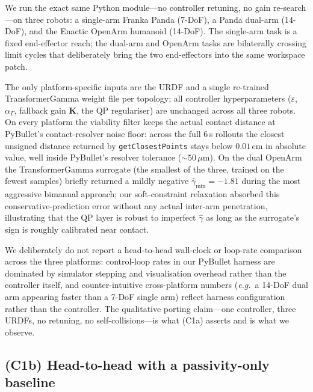\documentclass[10pt,conference]{IEEEtran}
\theoremstyle{remark}
\theoremstyle{plain}
\begin{document}
We run the exact same Python module---no controller retuning, no
gain re-search---on three robots: a single-arm Franka Panda
(7-DoF), a Panda dual-arm (14-DoF), and the Enactic OpenArm
humanoid (14-DoF). The single-arm task is a fixed end-effector
reach; the dual-arm and OpenArm tasks are bilaterally crossing
limit cycles that deliberately bring the two end-effectors into
the same workspace patch.

The only platform-specific inputs are the URDF and a single
re-trained TransformerGamma weight file per topology; all
controller hyperparameters ($\varepsilon$, $\alpha_\Gamma$,
fallback gain $\bm K$, the QP regulariser) are unchanged across
all three robots. On every platform the viability filter keeps
the actual contact distance at PyBullet's contact-resolver noise
floor: across the full 6\,s rollouts the closest unsigned
distance returned by \texttt{getClosestPoints} stays below
$0.01$\,cm in absolute value, well inside PyBullet's resolver
tolerance ($\sim\!50\,\mu$m). On the dual OpenArm the
TransformerGamma surrogate (the smallest of the three, trained on
the fewest samples) briefly returned a mildly negative
$\hat{\gamma}_{\min}=-1.81$ during the most aggressive bimanual
approach; our soft-constraint relaxation absorbed this
conservative-prediction error without any actual inter-arm
penetration, illustrating that the QP layer is robust to
imperfect $\hat{\gamma}$ as long as the surrogate's sign is
roughly calibrated near contact.

We deliberately do not report a head-to-head wall-clock or
loop-rate comparison across the three platforms: control-loop
rates in our PyBullet harness are dominated by simulator stepping
and visualisation overhead rather than the controller itself, and
counter-intuitive cross-platform numbers (\emph{e.g.}\ a 14-DoF
dual arm appearing faster than a 7-DoF single arm) reflect
harness configuration rather than the controller. The qualitative
porting claim---one controller, three URDFs, no retuning, no
self-collisions---is what (C1a) asserts and is what we observe.

\subsection{(C1b) Head-to-head with a passivity-only baseline}
\label{sec:exp-baseline}
\end{document}
